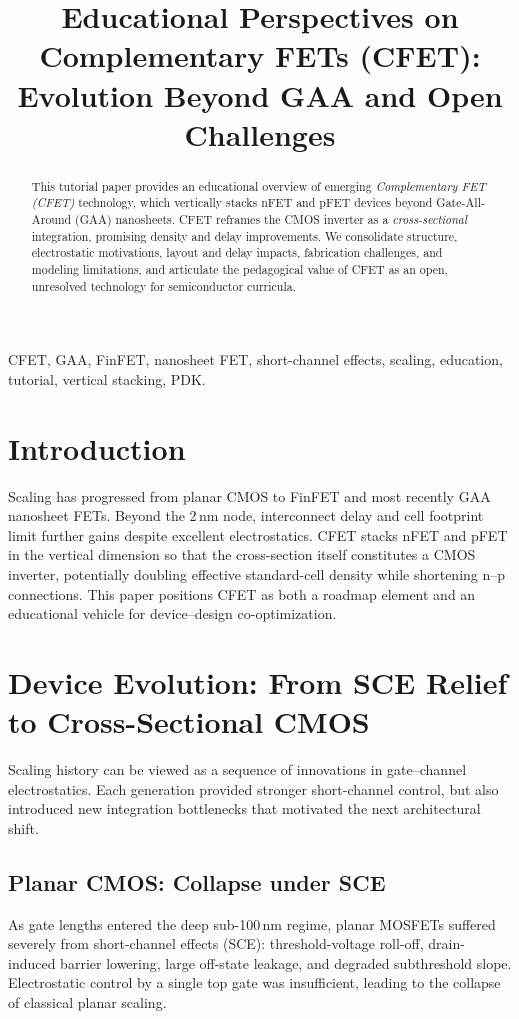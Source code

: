 \documentclass[conference]{IEEEtran}
\title{Educational Perspectives on Complementary FETs (CFET):\\
Evolution Beyond GAA and Open Challenges}
\author{
\IEEEauthorblockN{Shinichi Samizo}
\IEEEauthorblockA{Independent Semiconductor Researcher\\
Project Design Hub, Samizo-AITL\\
\textit{Email:} \href{mailto:shin3t72@gmail.com}{shin3t72@gmail.com}\quad
\textit{GitHub:} \href{https://github.com/Samizo-AITL}{Samizo-AITL}}
}
\begin{document}
\maketitle

\begin{abstract}
This tutorial paper provides an educational overview of emerging
\emph{Complementary FET (CFET)} technology, which vertically stacks nFET and pFET devices beyond Gate-All-Around (GAA) nanosheets.
CFET reframes the CMOS inverter as a \emph{cross-sectional} integration, promising density and delay improvements.
We consolidate structure, electrostatic motivations, layout and delay impacts, fabrication challenges, and modeling limitations, and articulate the pedagogical value of CFET as an open, unresolved technology for semiconductor curricula.
\end{abstract}

\begin{IEEEkeywords}
CFET, GAA, FinFET, nanosheet FET, short-channel effects, scaling, education, tutorial, vertical stacking, PDK.
\end{IEEEkeywords}

\section{Introduction}
Scaling has progressed from planar CMOS to FinFET and most recently GAA nanosheet FETs.
Beyond the 2\,nm node, interconnect delay and cell footprint limit further gains despite excellent electrostatics.
CFET stacks nFET and pFET in the vertical dimension so that the cross-section itself constitutes a CMOS inverter, potentially doubling effective standard-cell density while shortening n--p connections.
This paper positions CFET as both a roadmap element and an educational vehicle for device--design co-optimization.

\section{Device Evolution: From SCE Relief to Cross-Sectional CMOS}

Scaling history can be viewed as a sequence of innovations in
gate–channel electrostatics. Each generation provided stronger
short-channel control, but also introduced new integration
bottlenecks that motivated the next architectural shift.

\subsection{Planar CMOS: Collapse under SCE}
As gate lengths entered the deep sub-100\,nm regime, planar MOSFETs
suffered severely from short-channel effects (SCE): threshold-voltage
roll-off, drain-induced barrier lowering, large off-state leakage, and
degraded subthreshold slope. Electrostatic control by a single top gate
was insufficient, leading to the collapse of classical planar scaling.
\end{document}
